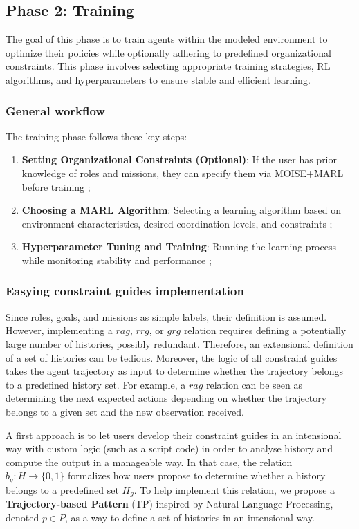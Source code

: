 \documentclass[pdflatex,sn-mathphys-num]{sn-jnl}%
\theoremstyle{thmstyleone}%
\theoremstyle{thmstyletwo}%
\theoremstyle{thmstylethree}%
\begin{document}
\subsection{Phase 2: Training}

The goal of this phase is to train agents within the modeled environment to optimize their policies while optionally adhering to predefined organizational constraints. This phase involves selecting appropriate training strategies, RL algorithms, and hyperparameters to ensure stable and efficient learning.

\subsubsection{General workflow}
The training phase follows these key steps:
\begin{enumerate}
    \item \textbf{Setting Organizational Constraints (Optional)}: If the user has prior knowledge of roles and missions, they can specify them via MOISE+MARL before training ;
    \item \textbf{Choosing a MARL Algorithm}: Selecting a learning algorithm based on environment characteristics, desired coordination levels, and constraints ;
    \item \textbf{Hyperparameter Tuning and Training}: Running the learning process while monitoring stability and performance ;
\end{enumerate}

\subsubsection{Easying constraint guides implementation}

Since roles, goals, and missions as simple labels, their definition is assumed. However, implementing a $rag$, $rrg$, or $grg$ relation requires defining a potentially large number of histories, possibly redundant. Therefore, an extensional definition of a set of histories can be tedious. Moreover, the logic of all constraint guides takes the agent trajectory as input to determine whether the trajectory belongs to a predefined history set. For example, a $rag$ relation can be seen as determining the next expected actions depending on whether the trajectory belongs to a given set and the new observation received.

A first approach is to let users develop their constraint guides in an intensional way with custom logic (such as a script code) in order to analyse history and compute the output in a manageable way. In that case, the relation $b_g: H \to \{0,1\}$ formalizes how users propose to determine whether a history belongs to a predefined set $H_g$.
To help implement this relation, we propose a \textbf{Trajectory-based Pattern} (TP) inspired by Natural Language Processing, denoted $p \in P$, as a way to define a set of histories in an intensional way.
\end{document}
